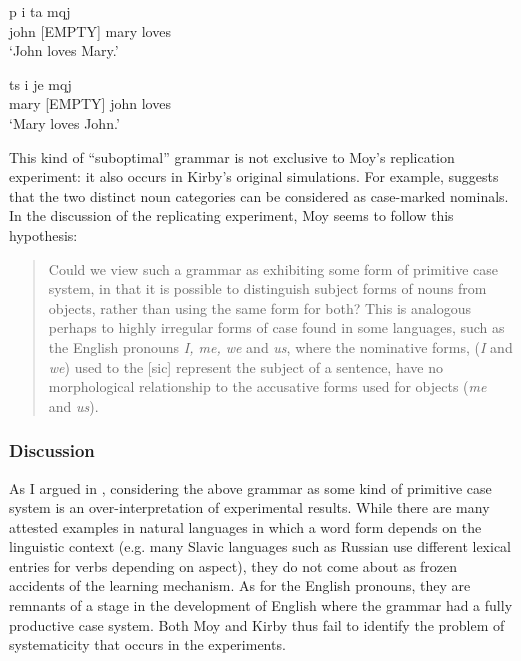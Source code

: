 \ea
\gll p i ta mqj \\
john {[EMPTY]} mary loves \\
\glt `John loves Mary.' \\

\item
\gll ts i je mqj \\
mary {[EMPTY]} john loves \\
\glt `Mary loves John.' \\
\z

This kind of ``suboptimal'' grammar is not exclusive to Moy's replication experiment: it also occurs in Kirby's original simulations. For example, \citet{kirby99syntax} suggests that the two distinct noun categories can be considered as case-marked nominals. In the discussion of the replicating experiment, Moy seems to follow this hypothesis:

\begin{quote}
Could we view such a grammar as exhibiting some form of primitive case system, in that it is possible to distinguish subject forms of nouns from objects, rather than using the same form for both? This is analogous perhaps to highly irregular forms of case found in some languages, such as the English pronouns {\em I, me, we} and {\em us}, where the nominative forms, ({\em I} and {\em we}) used to the [sic] represent the subject of a sentence, have no morphological relationship to the accusative forms used for objects ({\em me} and {\em us}). \citep[114]{moy06case}
\end{quote}
 
\subsubsection{Discussion}
As I argued in , considering the above grammar as some kind of primitive case system is an over-interpretation of experimental results. While there are many attested examples in natural languages in which a word form depends on the linguistic context (e.g. many Slavic languages such as Russian use different lexical entries for verbs depending on aspect), they do not come about as frozen accidents of the learning mechanism. As for the English pronouns, they are remnants of a stage in the development of English where the grammar had a fully productive case system. Both Moy and Kirby thus fail to identify the problem of systematicity that occurs in the experiments.

